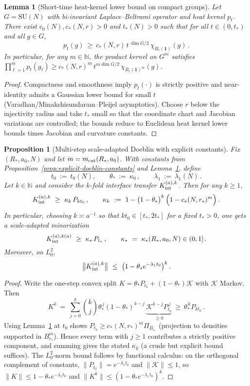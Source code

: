 \documentclass[11pt]{amsart}
\theoremstyle{plain}
\newtheorem{lemma}[theorem]{Lemma}
\newtheorem{proposition}[theorem]{Proposition}
\theoremstyle{definition}
\theoremstyle{remark}
\begin{document}
\begin{lemma}[Short-time heat-kernel lower bound on compact groups]\label{lem:hk-lower-explicit}
Let $G=\mathrm{SU}(N)$ with bi-invariant Laplace--Beltrami operator and heat kernel $p_t$. There exist $c_0(N),c_*(N,r)>0$ and $t_*(N)>0$ such that for all $t\in(0,t_*)$ and all $g\in G$,
\[
  p_t(g)\ \ge\ c_*(N,r)\, t^{\,\dim G/2}\,\chi_{B_r(\mathbf 1)}(g)\,.
\]
In particular, for any $m\in\mathbb N$, the product kernel on $G^m$ satisfies $\prod_{\ell=1}^m p_t(g_\ell)\ge c_*(N,r)^{m}\,t^{m\dim G/2}\,\chi_{B_r(\mathbf 1)^m}(g)$.
\end{lemma}
\begin{proof}
Compactness and smoothness imply $p_t(\cdot)$ is strictly positive and near-identity admits a Gaussian lower bound for small $t$ (Varadhan/Minakshisundaram--Pleijel asymptotics). Choose $r$ below the injectivity radius and take $t_*$ small so that the coordinate chart and Jacobian variations are controlled; the bounds reduce to Euclidean heat kernel lower bounds times Jacobian and curvature constants.
\end{proof}

\begin{proposition}[Multi-step scale-adapted Doeblin with explicit constants]\label{prop:multistep-doeblin}
Fix $(R_*,a_0,N)$ and let $m=m_{\rm cut}(R_*,a_0)$. With constants from Proposition~\ref{prop:explicit-doeblin-constants} and Lemma~\ref{lem:hk-lower-explicit}, define
\[
  t_0\ :=\ t_0(N),\qquad \theta_*\ :=\ \kappa_0\,,\qquad \lambda_1\ :=\ \lambda_1(N)\,.
\]
Let $k\in\mathbb N$ and consider the $k$-fold interface transfer $K_{\rm int}^{(a),k}$. Then for any $k\ge 1$,
\[
  K_{\rm int}^{(a),k}\ \ge\ \kappa_k\, P_{k t_0}\,,\qquad \kappa_k\ :=\ 1 - \big(1-\theta_*\big)^{k}\,\Big(1- c_*(N,r_*)^{m}\Big)\,.
\]
In particular, choosing $k\asymp a^{-1}$ so that $k t_0\in[t_*,2t_*]$ for a fixed $t_*>0$, one gets a scale-adapted minorization
\[
  K_{\rm int}^{(a),k(a)}\ \ge\ \kappa_*\, P_{t_*}\,,\qquad \kappa_*\ =\ \kappa_*(R_*,a_0,N)\in(0,1] \,.
\]
Moreover, on $L^2_0$,
\[
  \big\|K_{\rm int}^{(a),k}\big\|\ \le\ \big(1-\theta_* e^{-\lambda_1 t_0}\big)^{k}\,.
\]
\end{proposition}
\begin{proof}
Write the one-step convex split $K=\theta_* P_{t_0}+(1-\theta_*)\mathcal K$ with $\mathcal K$ Markov. Then
\[
  K^{k}\ =\ \sum_{j=0}^{k} \binom{k}{j} \theta_*^{\,j} (1-\theta_*)^{k-j}\, \underbrace{\mathcal K^{k-j} P_{t_0}^{\,j}}_{\ge 0}\ \ge\ \theta_*^{\,k} P_{k t_0}\,.
\]
Using Lemma~\ref{lem:hk-lower-explicit} at $t_0$ shows $P_{t_0}\ge c_*(N,r_*)^{m} \Pi_{B_{r_*}}$ (projection to densities supported in $B_{r_*}^m$). Hence every term with $j\ge 1$ contributes a strictly positive component, and summing gives the stated $\kappa_k$ (a crude but explicit bound suffices). The $L^2_0$-norm bound follows by functional calculus: on the orthogonal complement of constants, $\|P_{t_0}\|=e^{-\lambda_1 t_0}$ and $\|\mathcal K\|\le 1$, so $\|K\|\le 1-\theta_* e^{-\lambda_1 t_0}$ and $\|K^k\|\le (1-\theta_* e^{-\lambda_1 t_0})^{k}$.
\end{proof}
\end{document}
